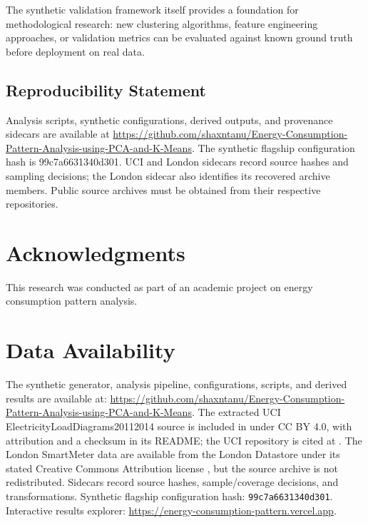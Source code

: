 \documentclass[11pt,a4paper]{article}
\begin{document}
The synthetic validation framework itself provides a foundation for methodological research: new clustering algorithms, feature engineering approaches, or validation metrics can be evaluated against known ground truth before deployment on real data.

\subsection{Reproducibility Statement}

Analysis scripts, synthetic configurations, derived outputs, and provenance sidecars are available at \url{https://github.com/shaxntanu/Energy-Consumption-Pattern-Analysis-using-PCA-and-K-Means}. The synthetic flagship configuration hash is 99c7a6631340d301. UCI and London sidecars record source hashes and sampling decisions; the London sidecar also identifies its recovered archive members. Public source archives must be obtained from their respective repositories.

\section*{Acknowledgments}
This research was conducted as part of an academic project on energy consumption pattern analysis.

\section*{Data Availability}
The synthetic generator, analysis pipeline, configurations, scripts, and derived results are available at: \url{https://github.com/shaxntanu/Energy-Consumption-Pattern-Analysis-using-PCA-and-K-Means}. The extracted UCI ElectricityLoadDiagrams20112014 source is included in  under CC BY 4.0, with attribution and a checksum in its README; the UCI repository is cited at \cite{trindade2015electricityloaddiagrams}. The London SmartMeter data are available from the London Datastore under its stated Creative Commons Attribution license \cite{london_smartmeter_datastore}, but the source archive is not redistributed. Sidecars record source hashes, sample/coverage decisions, and transformations. Synthetic flagship configuration hash: \texttt{99c7a6631340d301}. Interactive results explorer: \url{https://energy-consumption-pattern.vercel.app}.
\end{document}
